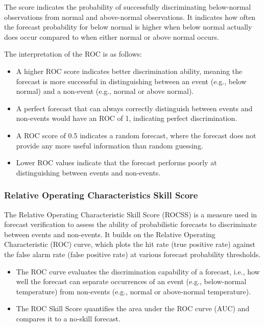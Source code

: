 The score indicates the probability of successfully discriminating below-normal observations from normal and above-normal observations. It indicates how often the forecast probability for below normal is higher when below normal actually does occur compared to when either normal or above normal occurs.

The interpretation of the ROC is as follows:  
\begin{itemize}
    \item A higher ROC score indicates better discrimination ability, meaning the forecast is more successful in distinguishing between an event (e.g., below normal) and a non-event (e.g., normal or above normal).  
    \item A perfect forecast that can always correctly distinguish between events and non-events would have an ROC of 1, indicating perfect discrimination.  
    \item A ROC score of 0.5 indicates a random forecast, where the forecast does not provide any more useful information than random guessing.  
    \item Lower ROC values indicate that the forecast performs poorly at distinguishing between events and non-events.  
\end{itemize}


\subsubsection{Relative Operating Characteristics Skill Score}

The Relative Operating Characteristic Skill Score (ROCSS) is a measure used in forecast verification to assess the ability of probabilistic forecasts to discriminate between events and non-events. It builds on the Relative Operating Characteristic (ROC) curve, which plots the hit rate (true positive rate) against the false alarm rate (false positive rate) at various forecast probability thresholds.

\begin{itemize}
	\item The ROC curve evaluates the discrimination capability of a forecast, i.e., how well the forecast can separate occurrences of an event (e.g., below-normal temperature) from non-events (e.g., normal or above-normal temperature).
	\item The ROC Skill Score quantifies the area under the ROC curve (AUC) and compares it to a no-skill forecast.
\end{itemize}

